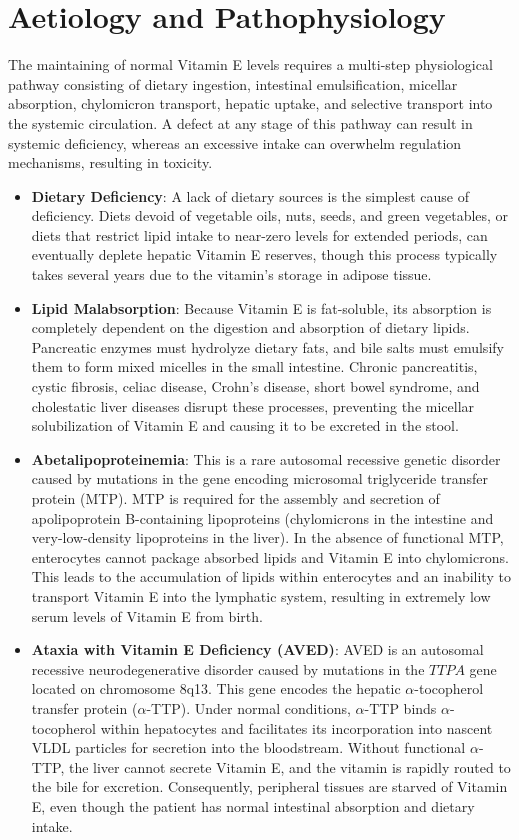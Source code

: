 \section*{Aetiology and Pathophysiology}
The maintaining of normal Vitamin E levels requires a multi-step physiological pathway consisting of dietary ingestion, intestinal emulsification, micellar absorption, chylomicron transport, hepatic uptake, and selective transport into the systemic circulation. A defect at any stage of this pathway can result in systemic deficiency, whereas an excessive intake can overwhelm regulation mechanisms, resulting in toxicity.

\begin{itemize}
    \item \textbf{Dietary Deficiency}: A lack of dietary sources is the simplest cause of deficiency. Diets devoid of vegetable oils, nuts, seeds, and green vegetables, or diets that restrict lipid intake to near-zero levels for extended periods, can eventually deplete hepatic Vitamin E reserves, though this process typically takes several years due to the vitamin's storage in adipose tissue.
    \item \textbf{Lipid Malabsorption}: Because Vitamin E is fat-soluble, its absorption is completely dependent on the digestion and absorption of dietary lipids. Pancreatic enzymes must hydrolyze dietary fats, and bile salts must emulsify them to form mixed micelles in the small intestine. Chronic pancreatitis, cystic fibrosis, celiac disease, Crohn's disease, short bowel syndrome, and cholestatic liver diseases disrupt these processes, preventing the micellar solubilization of Vitamin E and causing it to be excreted in the stool.
    \item \textbf{Abetalipoproteinemia}: This is a rare autosomal recessive genetic disorder caused by mutations in the gene encoding microsomal triglyceride transfer protein (MTP). MTP is required for the assembly and secretion of apolipoprotein B-containing lipoproteins (chylomicrons in the intestine and very-low-density lipoproteins in the liver). In the absence of functional MTP, enterocytes cannot package absorbed lipids and Vitamin E into chylomicrons. This leads to the accumulation of lipids within enterocytes and an inability to transport Vitamin E into the lymphatic system, resulting in extremely low serum levels of Vitamin E from birth.
    \item \textbf{Ataxia with Vitamin E Deficiency (AVED)}: AVED is an autosomal recessive neurodegenerative disorder caused by mutations in the $TTPA$ gene located on chromosome 8q13. This gene encodes the hepatic $\alpha$-tocopherol transfer protein ($\alpha$-TTP). Under normal conditions, $\alpha$-TTP binds $\alpha$-tocopherol within hepatocytes and facilitates its incorporation into nascent VLDL particles for secretion into the bloodstream. Without functional $\alpha$-TTP, the liver cannot secrete Vitamin E, and the vitamin is rapidly routed to the bile for excretion. Consequently, peripheral tissues are starved of Vitamin E, even though the patient has normal intestinal absorption and dietary intake.

\end{itemize}
